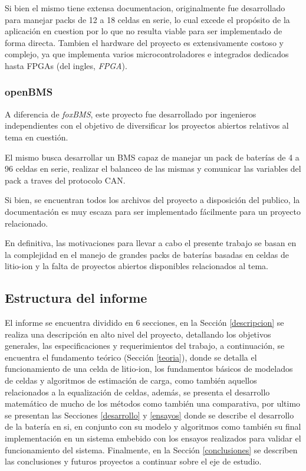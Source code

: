 \documentclass[10pt,a4paper]{article}
\begin{document}
\noindent Si bien el mismo tiene extensa documentacion, originalmente fue
desarrollado para manejar packs de 12 a 18 celdas en serie, lo cual excede el
prop\'osito de la aplicaci\'on en cuestion por lo que no resulta viable para ser
implementado de forma directa. Tambien el hardware del proyecto es
extensivamente costoso y complejo, ya que implementa varios microcontroladores e
integrados dedicados hasta \acrshort{FPGA}s (del ingles, \emph{\acrlong{FPGA}}).

\subsubsection{openBMS}

A diferencia de \emph{foxBMS}, este proyecto fue desarrollado por ingenieros
independientes con el objetivo de diversificar los proyectos abiertos relativos
al tema en cuesti\'on.

\noindent El mismo busca desarrollar un \acrshort{BMS} capaz de manejar un
pack de bater\'ias de 4 a 96 celdas en serie, realizar el balanceo de las mismas 
y comunicar las variables del pack a traves del protocolo \acrshort{CAN}.

\noindent Si bien, se encuentran todos los archivos del proyecto a disposición
del publico, la documentaci\'on es muy escaza para ser implementado
f\'acilmente para un proyecto relacionado.

\noindent En definitiva, las motivaciones para llevar a cabo el presente trabajo
se basan en la complejidad en el manejo de grandes packs de
bater\'ias basadas en celdas de litio-ion y la falta de proyectos abiertos
disponibles relacionados al tema.

\subsection{Estructura del informe}

El informe se encuentra dividido en 6 secciones, en la Sección \ref{descripcion}
se realiza una descripci\'on en alto nivel del proyecto, detallando los
objetivos generales, las especificaciones y requerimientos del trabajo, a
continuaci\'on, se encuentra el fundamento te\'orico (Secci\'on \ref{teoria}),
donde se detalla el funcionamiento de una celda de litio-ion, los fundamentos
b\'asicos de modelados de celdas y algoritmos de estimaci\'on de carga, como
tambi\'en aquellos relacionados a la equalizaci\'on de celdas, adem\'as, se
presenta el desarrollo matem\'atico de mucho de los m\'etodos como tambi\'en una
comparativa, por ultimo se presentan las Secciones \ref{desarrollo} y
\ref{ensayos} donde se describe el desarrollo de la bater\'ia en si, en conjunto
con su modelo y algoritmos como tambi\'en su final implementaci\'on en un
sistema embebido con los ensayos realizados para validar el funcionamiento del
sistema. Finalmente, en la Secci\'on \ref{conclusiones} se describen las
conclusiones y futuros proyectos a continuar sobre el eje de estudio.
\end{document}
